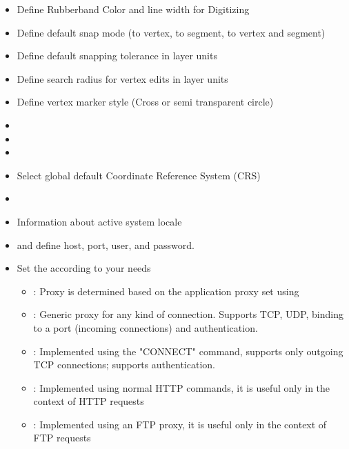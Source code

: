 
\begin{itemize}
\item Define Rubberband Color and line width for Digitizing
\item Define default snap mode (to vertex, to segment, to vertex and segment)
\item Define default snapping tolerance in layer units
\item Define search radius for vertex edits in layer units
\item Define vertex marker style (Cross or semi transparent circle)
\end{itemize}


\begin{itemize}
\item {}
\item {}
\item {}
\item Select global default Coordinate Reference System (CRS)
\end{itemize}


\begin{itemize}
\item {}
\item Information about active system locale
\end{itemize}


\begin{itemize}
\item {} and define host, port, user, and password.
\item Set the  according to your needs
 \begin{itemize}
  \item {}: Proxy is determined based on the application proxy set using
  \item {}: Generic proxy for any kind of connection. Supports TCP, UDP, binding to a port (incoming connections) and authentication.
  \item {}: Implemented using the "CONNECT" command, supports only outgoing TCP connections; supports authentication.
  \item {}: Implemented using normal HTTP commands, it is useful only in the context of HTTP requests
  \item {}: Implemented using an FTP proxy, it is useful only in the context of FTP requests
 \end{itemize}
\end{itemize}

